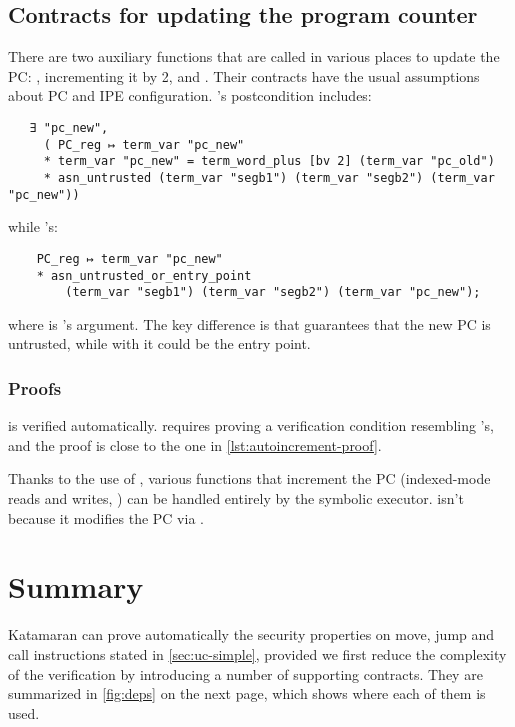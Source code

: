 \subsection{Contracts for updating the program counter}

There are two auxiliary functions that are called in various places to update the PC: , incrementing it by 2, and . Their contracts have the usual assumptions about PC and IPE configuration. 's postcondition includes:
\begin{verbatim}
   ∃ "pc_new",
     ( PC_reg ↦ term_var "pc_new"
     * term_var "pc_new" = term_word_plus [bv 2] (term_var "pc_old")
     * asn_untrusted (term_var "segb1") (term_var "segb2") (term_var "pc_new"))
\end{verbatim}
while 's:
\begin{verbatim}
    PC_reg ↦ term_var "pc_new"
    * asn_untrusted_or_entry_point
        (term_var "segb1") (term_var "segb2") (term_var "pc_new");
\end{verbatim}
where  is 's argument. The key difference is that  guarantees that the new PC is untrusted, while with  it could be the entry point.

\subsubsection{Proofs}

 is verified automatically.  requires proving a verification condition resembling 's, and the proof is close to the one in \cref{lst:autoincrement-proof}.

Thanks to the use of , various functions that increment the PC (indexed-mode reads and writes, ) can be handled entirely by the symbolic executor.  isn't because it modifies the PC via .

\section{Summary}

Katamaran can prove automatically the security properties on move, jump and call instructions stated in \cref{sec:uc-simple}, provided we first reduce the complexity of the verification by introducing a number of supporting contracts. They are summarized in \cref{fig:deps} on the next page, which shows where each of them is used.

